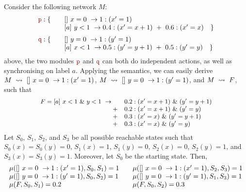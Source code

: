 \begin{example}
  Consider the following network $M$:
  \begin{displaymath}
    \begin{array}{llll}
      \role{p}: \{ & \quad \commandBase {}{x=0} {1:(x'=1)}\\
                   & \quad \commandBase {a}{y<1} {0.4: (x'=x+1)\ +\ 0.6: (x'=x)}\quad \}\\[2mm]
      \role{q}: \{ & \quad \commandBase {}{y=0} {1:(y'=1)}\\
                   & \quad \commandBase {a}{x<1} {0.5: (y'=y+1)\ +\ 0.5: (y'=y)}\quad \}\\
    \end{array}
  \end{displaymath}
  above, the two modules $\role p$ and $\role q$ can both do
  independent actions, as well as synchronising on label $a$. Applying
  the semantics, we can easily derive
  $M\ \stackrel{}{\rightsquigarrow}\ []\ x=0\ \rightarrow 1:(x'=1)$,
  $M\ \stackrel{}{\rightsquigarrow}\ []\ y=0\ \rightarrow 1:(y'=1)$, and $M\ \stackrel{}{\rightsquigarrow}\ F$,
  such that
  \begin{displaymath}\small
    \begin{array}{rlll}
      F=\commandBase {a}{x<1\ \&\ y<1} {\quad} & 0.2: (x'=x+1)\ \&\ (y'=y+1)\\
                                       + & 0.2: (x'=x+1)\ \&\ (y'=y)\\
                                       + & 0.3: (x'=x)\ \&\ (y'=y+1)\\
                                       + & 0.3: (x'=x)\ \&\ (y'=y)\\
    \end{array}
  \end{displaymath}  
  Let $S_0$, $S_1$, $S_2$, and $S_3$ be all possible reachable states
  such that
  $S_0(x)=S_0(y)=0$, $S_1(x)=1$, $S_1(y)=0$, $S_2(x)=0$, $S_2(y)=1$,
  and $S_3(x)=S_3(y)=1$.
  Moreover, let $S_0$ be the starting state. Then, %
  \begin{displaymath}
    \begin{array}{ll}
      \mu([]\ x=0\ \rightarrow 1:(x'=1), S_0, S_1) = 1
      & \quad \mu([]\ x=0\ \rightarrow 1:(x'=1), S_2, S_3) = 1\\
      \mu([]\ y=0\ \rightarrow 1:(y'=1), S_0, S_2) = 1
      & \quad \mu([]\ y=0\ \rightarrow 1:(y'=1), S_1, S_3) = 1\\ 
      \mu(F, S_0, S_1) = 0.2 &\quad\mu(F, S_0, S_2) = 0.3\\

\end{array}
\end{displaymath}
\end{example}

